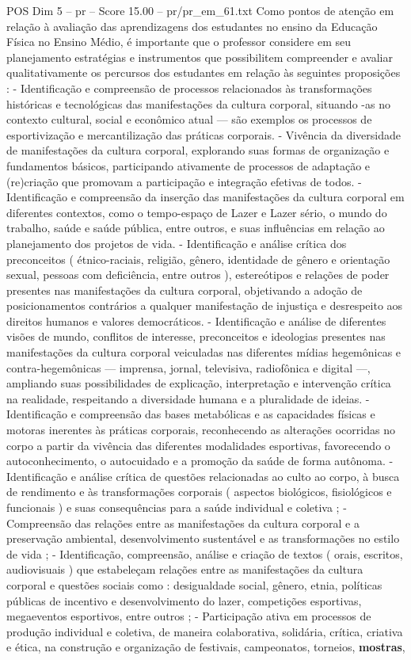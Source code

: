 \begin{textsample}{POS Dim 5 – pr – Score 15.00 – pr/pr\_em\_61.txt}
Como pontos de atenção em relação à avaliação das aprendizagens dos estudantes no ensino da Educação Física no Ensino Médio, é importante que o professor considere em seu planejamento estratégias e instrumentos que possibilitem compreender e avaliar qualitativamente os percursos dos estudantes em relação às seguintes proposições : - Identificação e compreensão de processos relacionados às transformações históricas e tecnológicas das manifestações da cultura corporal, situando -as no contexto cultural, social e econômico atual — são exemplos os processos de esportivização e mercantilização das práticas corporais. - Vivência da diversidade de manifestações da cultura corporal, explorando suas formas de organização e fundamentos básicos, participando ativamente de processos de adaptação e (re)criação que promovam a participação e integração efetivas de todos. - Identificação e compreensão da inserção das manifestações da cultura corporal em diferentes contextos, como o tempo-espaço de Lazer e Lazer sério, o mundo do trabalho, saúde e saúde pública, entre outros, e suas influências em relação ao planejamento dos projetos de vida. - Identificação e análise crítica dos preconceitos ( étnico-raciais, religião, gênero, identidade de gênero e orientação sexual, pessoas com deficiência, entre outros ), estereótipos e relações de poder presentes nas manifestações da cultura corporal, objetivando a adoção de posicionamentos contrários a qualquer manifestação de injustiça e desrespeito aos direitos humanos e valores democráticos. - Identificação e análise de diferentes visões de mundo, conflitos de interesse, preconceitos e ideologias presentes nas manifestações da cultura corporal veiculadas nas diferentes mídias hegemônicas e contra-hegemônicas — imprensa, jornal, televisiva, radiofônica e digital —, ampliando suas possibilidades de explicação, interpretação e intervenção crítica na realidade, respeitando a diversidade humana e a pluralidade de ideias. - Identificação e compreensão das bases metabólicas e as capacidades físicas e motoras inerentes às práticas corporais, reconhecendo as alterações ocorridas no corpo a partir da vivência das diferentes modalidades esportivas, favorecendo o autoconhecimento, o autocuidado e a promoção da saúde de forma autônoma. - Identificação e análise crítica de questões relacionadas ao culto ao corpo, à busca de rendimento e às transformações corporais ( aspectos biológicos, fisiológicos e funcionais ) e suas consequências para a saúde individual e coletiva ; - Compreensão das relações entre as manifestações da cultura corporal e a preservação ambiental, desenvolvimento sustentável e as transformações no estilo de vida ; - Identificação, compreensão, análise e criação de textos ( orais, escritos, audiovisuais ) que estabeleçam relações entre as manifestações da cultura corporal e questões sociais como : desigualdade social, gênero, etnia, políticas públicas de incentivo e desenvolvimento do lazer, competições esportivas, megaeventos esportivos, entre outros ; - Participação ativa em processos de produção individual e coletiva, de maneira colaborativa, solidária, crítica, criativa e ética, na construção e organização de festivais, campeonatos, torneios, \textbf{mostras}, 
\end{textsample}
